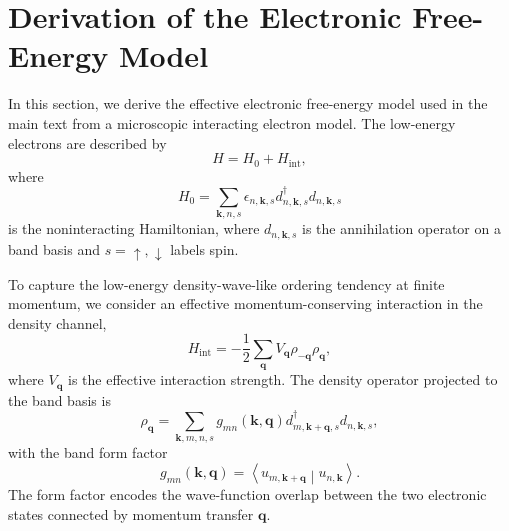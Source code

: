 \documentclass[aps,prl,article,twocolumn,preprintnumbers,amsmath,amssymb,superscriptaddress]{revtex4-2}
\begin{document}
\appendix


\section{Derivation of the Electronic Free-Energy Model}\label{app:derivationFreeEnergy}

In this section, we derive the effective electronic free-energy model
used in the main text from a microscopic interacting electron model.
The low-energy electrons are described by
\begin{equation}
H
=
H_0
+
H_{\mathrm{int}},
\end{equation}
where
\begin{equation}
H_0
=
\sum_{\mathbf k,n,s}
\epsilon_{n,\mathbf k,s}
d^\dagger_{n,\mathbf k,s}
d_{n,\mathbf k,s}
\end{equation}
is the noninteracting Hamiltonian, where $d_{n,\mathbf k,s}$ is the
annihilation operator on a band basis and $s=\uparrow,\downarrow$ labels
spin.

To capture the low-energy density-wave-like ordering tendency at finite
momentum, we consider an effective momentum-conserving interaction in
the density channel,
\begin{equation}
\label{eq:siInteraction}
H_{\mathrm{int}}
=
-
\frac12
\sum_{\mathbf q}
V_{\mathbf q}
\rho_{-\mathbf q}
\rho_{\mathbf q},
\end{equation}
where $V_{\mathbf q}$ is the effective interaction strength.
The density operator projected to the band basis is
\begin{equation}
\rho_{\mathbf q}
=
\sum_{\mathbf k,m,n,s}
g_{mn}(\mathbf k,\mathbf q)
d^\dagger_{m,\mathbf k+\mathbf q,s}
d_{n,\mathbf k,s},
\end{equation}
with the band form factor
\begin{equation}
g_{mn}(\mathbf k,\mathbf q)
=
\left\langle
u_{m,\mathbf k+\mathbf q}
\middle|
u_{n,\mathbf k}
\right\rangle .
\end{equation}
The form factor encodes the wave-function overlap between the two
electronic states connected by momentum transfer $\mathbf q$.
\end{document}

